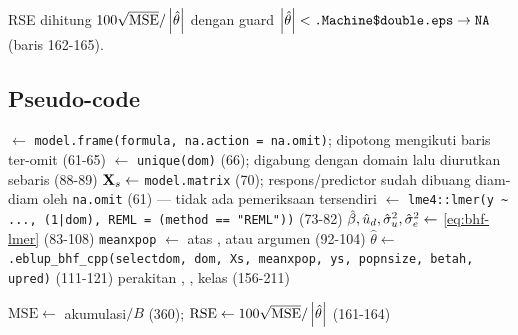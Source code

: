 RSE dihitung $100\sqrt{\mathrm{MSE}}/\left|\hat\theta\right|$ dengan guard
$\left|\hat\theta\right|<\texttt{.Machine\$double.eps}\to\texttt{NA}$
(baris 162-165).

\subsection{Pseudo-code}\label{sec:bhf-algo}

\begin{algorithm}[htbp]
\caption{\texttt{eblup\_bhf} --- alur sebenarnya (\texttt{R/eblup\_bhf.R:44-212}, \texttt{src/eblup\_unit.cpp:8-108})}
\label{alg:bhf}
 $\leftarrow$ \texttt{model.frame(formula, na.action = na.omit)};  dipotong mengikuti baris ter-omit (61-65)\;
 $\leftarrow$ \texttt{unique(dom)} (66); digabung dengan domain  lalu  diurutkan sebaris (88-89)\;
$\mathbf{X}_s\leftarrow$ \texttt{model.matrix} (70);  respons/predictor sudah dibuang diam-diam oleh \texttt{na.omit} (61) --- tidak ada pemeriksaan  tersendiri\;
 $\leftarrow$ \texttt{lme4::lmer(y \textasciitilde{} ..., (1|dom), REML = (method == "REML"))} (73-82)\;
$\hat\beta,\hat u_d,\hat\sigma_u^2,\hat\sigma_e^2\leftarrow$ \eqref{eq:bhf-lmer} (83-108)\;
\texttt{meanxpop} $\leftarrow$  atas , atau argumen  (92-104)\;
$\hat\theta\leftarrow$ \texttt{.eblup\_bhf\_cpp(selectdom, dom, Xs, meanxpop, ys, popnsize, betah, upred)} (111-121)\;
\;
\;
perakitan , , kelas  (156-211)\;
\caption*{}
\KwData{}
\;
$\mathrm{MSE}\leftarrow$ akumulasi$/B$ (360);\quad
  $\mathrm{RSE}\leftarrow100\sqrt{\mathrm{MSE}}/\left|\hat\theta\right|$ (161-164)\;
\end{algorithm}

